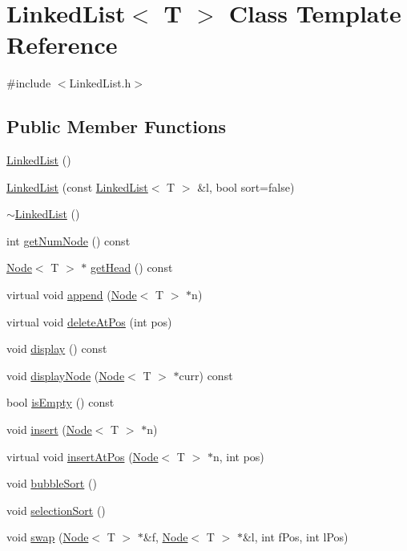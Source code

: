 \hypertarget{classLinkedList}{}\section{Linked\+List$<$ T $>$ Class Template Reference}
\label{classLinkedList}


{\ttfamily \#include $<$Linked\+List.\+h$>$}

\subsection*{Public Member Functions}
\begin{DoxyCompactItemize}
\item 
\hyperlink{classLinkedList_a3c20fcfec867e867f541061a09fc640c}{Linked\+List} ()
\item 
\hyperlink{classLinkedList_a6d0ec2b365564af3f855d245a85bcbef}{Linked\+List} (const \hyperlink{classLinkedList}{Linked\+List}$<$ T $>$ \&l, bool sort=false)
\item 
\hyperlink{classLinkedList_a7c37609df3b83bc4eb0281b852f93fd7}{$\sim$\+Linked\+List} ()
\item 
int \hyperlink{classLinkedList_ae04dbbcae32f8fb03dce3e174854981f}{get\+Num\+Node} () const 
\item 
\hyperlink{classNode}{Node}$<$ T $>$ $\ast$ \hyperlink{classLinkedList_af59e26b062e8e9549974adfa5bb51eb2}{get\+Head} () const 
\item 
virtual void \hyperlink{classLinkedList_ac2f92598858e9ba02af8722fba803c53}{append} (\hyperlink{classNode}{Node}$<$ T $>$ $\ast$n)
\item 
virtual void \hyperlink{classLinkedList_a62a89a30509d38b88c75177b8efa9a98}{delete\+At\+Pos} (int pos)
\item 
void \hyperlink{classLinkedList_afddb5dbcc39e687add40de41b975cd8d}{display} () const 
\item 
void \hyperlink{classLinkedList_a7ed3bb4986b76cbfd3547d0b262ffff3}{display\+Node} (\hyperlink{classNode}{Node}$<$ T $>$ $\ast$curr) const 
\item 
bool \hyperlink{classLinkedList_a1b28b1e19e5aa68f3d89352e307928f6}{is\+Empty} () const 
\item 
void \hyperlink{classLinkedList_a718246359a2199be67212703be951071}{insert} (\hyperlink{classNode}{Node}$<$ T $>$ $\ast$n)
\item 
virtual void \hyperlink{classLinkedList_aa7b12c5f9bb22be91012d68c9da0b431}{insert\+At\+Pos} (\hyperlink{classNode}{Node}$<$ T $>$ $\ast$n, int pos)
\item 
void \hyperlink{classLinkedList_aa644d66bfb879e71d1805a794a78b928}{bubble\+Sort} ()
\item 
void \hyperlink{classLinkedList_abd329a83adcec046dc482f7566cf91f4}{selection\+Sort} ()
\item 
void \hyperlink{classLinkedList_adea39e4b5d8f3fcb608c11f7746790ed}{swap} (\hyperlink{classNode}{Node}$<$ T $>$ $\ast$\&f, \hyperlink{classNode}{Node}$<$ T $>$ $\ast$\&l, int f\+Pos, int l\+Pos)
\end{DoxyCompactItemize}
